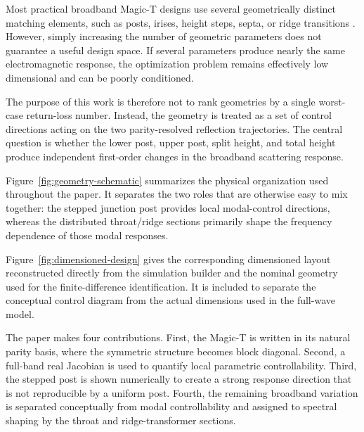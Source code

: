 \documentclass[journal]{IEEEtran}
\begin{document}
Most practical broadband Magic-T designs use several geometrically distinct matching elements, such as posts, irises, height steps, septa, or ridge transitions \cite{peng2024ridge,leal2013compact,ggw2022}.
However, simply increasing the number of geometric parameters does not guarantee a useful design space.
If several parameters produce nearly the same electromagnetic response, the optimization problem remains effectively low dimensional and can be poorly conditioned.

The purpose of this work is therefore not to rank geometries by a single worst-case return-loss number.
Instead, the geometry is treated as a set of control directions acting on the two parity-resolved reflection trajectories.
The central question is whether the lower post, upper post, split height, and total height produce independent first-order changes in the broadband scattering response.

Figure~\ref{fig:geometry-schematic} summarizes the physical organization used throughout the paper.
It separates the two roles that are otherwise easy to mix together: the stepped junction post provides local modal-control directions, whereas the distributed throat/ridge sections primarily shape the frequency dependence of those modal responses.



Figure~\ref{fig:dimensioned-design} gives the corresponding dimensioned layout reconstructed directly from the simulation builder and the nominal geometry used for the finite-difference identification.  It is included to separate the conceptual control diagram from the actual dimensions used in the full-wave model.



The paper makes four contributions.
First, the Magic-T is written in its natural parity basis, where the symmetric structure becomes block diagonal.
Second, a full-band real Jacobian is used to quantify local parametric controllability.
Third, the stepped post is shown numerically to create a strong response direction that is not reproducible by a uniform post.
Fourth, the remaining broadband variation is separated conceptually from modal controllability and assigned to spectral shaping by the throat and ridge-transformer sections.
\end{document}
